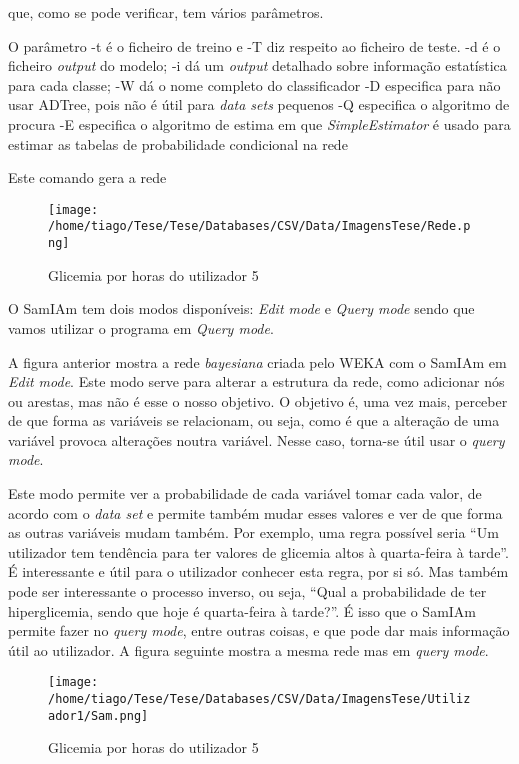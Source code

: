 que, como se pode verificar, tem vários parâmetros.

O parâmetro -t é o ficheiro de treino e -T diz respeito ao ficheiro de teste.
-d é o ficheiro \textit{output} do modelo;
-i dá um \textit{output} detalhado sobre informação estatística para cada classe;
-W dá o nome completo do classificador
-D especifica para não usar ADTree, pois não é útil para \textit{data sets} pequenos
-Q especifica o algoritmo de procura
-E especifica o algoritmo de estima em que \textit{SimpleEstimator} é usado para estimar as tabelas de probabilidade condicional na rede

Este comando gera a rede


\begin{figure}[H]
\centering
\texttt{[image: /home/tiago/Tese/Tese/Databases/CSV/Data/ImagensTese/Rede.png]}
\caption{Glicemia por horas do utilizador 5}
\end{figure}


O SamIAm tem dois modos disponíveis: \textit{Edit mode} e \textit{Query mode} sendo que vamos utilizar o programa em \textit{Query mode}. 

A figura anterior mostra a rede \textit{bayesiana} criada pelo WEKA com o SamIAm em \textit{Edit mode}. Este modo serve para alterar a estrutura da rede, como adicionar nós ou arestas, mas não é esse o nosso objetivo. O objetivo é, uma vez mais, perceber de que forma as variáveis se relacionam, ou seja, como é que a alteração de uma variável provoca alterações noutra variável. Nesse caso, torna-se útil usar o \textit{query mode}. 

Este modo permite ver a probabilidade de cada variável tomar cada valor, de acordo com o \textit{data set} e permite também mudar esses valores e ver de que forma as outras variáveis mudam também. Por exemplo, uma regra possível seria ``Um utilizador tem tendência para ter valores de glicemia altos à quarta-feira à tarde''. É interessante e útil para o utilizador conhecer esta regra, por si só. Mas também pode ser interessante o processo inverso, ou seja, ``Qual a probabilidade de ter hiperglicemia, sendo que hoje é quarta-feira à tarde?''. É isso que o SamIAm permite fazer no \textit{query mode}, entre outras coisas, e que pode dar mais informação útil ao utilizador. A figura seguinte mostra a mesma rede mas em \textit{query mode}.

\begin{figure}[H]
\centering
\texttt{[image: /home/tiago/Tese/Tese/Databases/CSV/Data/ImagensTese/Utilizador1/Sam.png]}
\caption{Glicemia por horas do utilizador 5}
\end{figure}

